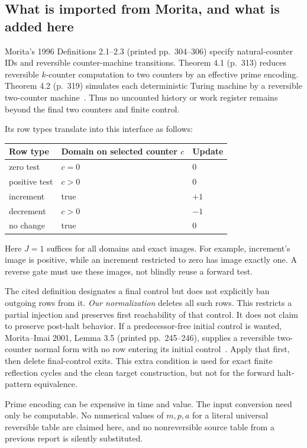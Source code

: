 \documentclass[11pt,a4paper]{article}
\numberwithin{equation}{section}
\begin{document}
\subsection{What is imported from Morita, and what is added here}
Morita's 1996 Definitions 2.1--2.3 (printed pp.~304--306) specify natural-counter
IDs and reversible counter-machine transitions. Theorem 4.1 (p.~313) reduces
reversible $k$-counter computation to two counters by an effective prime
encoding. Theorem 4.2 (p.~319) simulates each deterministic Turing machine by a
reversible two-counter machine~\cite{fpa:morita1996}. Thus no uncounted history or
work register remains beyond the final two counters and finite control.

Its row types translate into this interface as follows:
\begin{center}
\begin{tabular}{lll}\toprule
Row type & Domain on selected counter $c$ & Update\\\midrule
zero test & $c=0$ & $0$\\
positive test & $c>0$ & $0$\\
increment & true & $+1$\\
decrement & $c>0$ & $-1$\\
no change & true & $0$\\\bottomrule
\end{tabular}
\end{center}
Here $J=1$ suffices for all domains and exact images. For example, increment's
image is positive, while an increment restricted to zero has image exactly
one. A reverse gate must use these images, not blindly reuse a forward test.

The cited definition designates a final control but does not explicitly ban
outgoing rows from it. \emph{Our normalization} deletes all such rows. This
restricts a partial injection and preserves first reachability of that control.
It does not claim to preserve post-halt behavior. If a predecessor-free initial
control is wanted, Morita--Imai 2001, Lemma 3.5 (printed pp.~245--246), supplies
a reversible two-counter normal form with no row entering its initial
control~\cite{fpa:moritaimai2001}. Apply that first, then delete final-control exits.
This extra condition is used for exact finite reflection cycles and the clean
target construction, but not for the forward halt-pattern equivalence.

Prime encoding can be expensive in time and value. The input conversion need
only be computable. No numerical values of $m,p,a$ for a literal universal
reversible table are claimed here, and no nonreversible source table from a
previous report is silently substituted.
\end{document}

